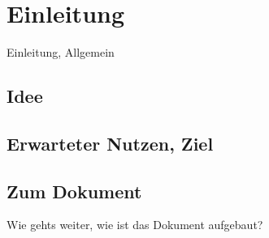 \chapter{Einleitung}

Einleitung, Allgemein\cite{ref}

\section{Idee}

\section{Erwarteter Nutzen, Ziel}

\section{Zum Dokument}

Wie gehts weiter, wie ist das Dokument aufgebaut?
